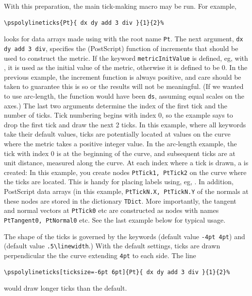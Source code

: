 \documentclass[11pt,english,BCOR=10mm,DIV=12,bibliography=totoc,parskip=false,headings=small,
    headinclude=false,footinclude=false,oneside]{pst-doc}
\begin{document}
With this preparation, the main tick-making macro may be run. For example,
\begin{verbatim}
\pspolylineticks{Pt}{ dx dy add 3 div }{1}{2}%
\end{verbatim}
looks for data arrays made using  with the root name \texttt{Pt}. The next argument, 
\texttt{dx dy add 3 div}, specifies the (PostScript) function of increments that should be used to 
construct the metric. If the keyword \verb|metricInitValue| is defined, eg, with 
, it is used as the initial value of the metric, 
otherwise it is defined to be 0. In the previous example, the increment function is always 
positive, and care should be taken to guarantee this is so or the results will not be meaningful. 
(If we wanted to use arc-length, the function would have been \texttt{ds}, assuming equal scales on 
the axes.) The last two arguments determine the index of the first tick and the number of ticks. 
Tick numbering begins with index 0, so the example says to drop the first tick and draw the 
next 2 ticks. In this example, where all keywords take their default values, ticks are 
potentially located at values on the curve where the metric takes a positive integer value. 
In the arc-length example, the tick with index 0 is at the beginning of the curve, and subsequent 
ticks are at unit distance, measured along the curve. At each index where a tick is drawn, a 
 is created: In this example, you create nodes \texttt{PtTick1, PtTick2} on the curve 
where the ticks are located. This is handy for placing labels using, eg, . In 
addition, PostScript data arrays (in this example, \texttt{PtTickN.X, PtTickN.Y} of the normals 
at these nodes are stored in the dictionary \texttt{TDict}. More importantly, the tangent and 
normal vectors at \texttt{PtTick0} etc are constructed as nodes with names \texttt{PtTangent0, PtNormal0} 
etc. See the last example below for typical usage.

The shape of the ticks is governed by the keywords  (default value \texttt{-4pt 4pt})
 and  (default value \verb|.5\linewidth|.) With the default settings, ticks 
 are drawn perpendicular the the curve extending \texttt{4pt} to each side. The line
\begin{verbatim}
\pspolylineticks[ticksize=-6pt 6pt]{Pt}{ dx dy add 3 div }{1}{2}%
\end{verbatim}
would draw longer ticks than the default.
\end{document}
